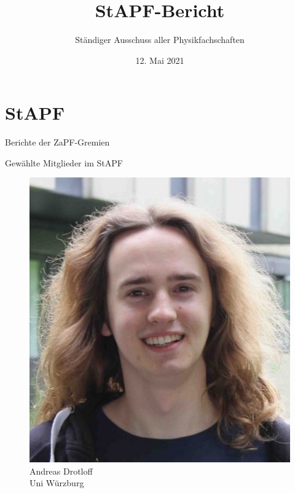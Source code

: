 \documentclass[compress, aspectratio=169]{beamer}
\title[StAPf-Bericht]{StAPF-Bericht}
\author{Ständiger Ausschuss aller Physikfachschaften}
\institute[Zusammenkunft aller Physikfachschaften]
\date{12. Mai 2021}
\begin{document}
\begin{frame}[plain]{}
  \titlepage
\end{frame}


\section{StAPF}

\begin{frame}
\centering
\Huge Berichte der ZaPF-Gremien
\end{frame}


\begin{frame}{Gewählte Mitglieder im StAPF}

  \begin{minipage}{.28\textwidth}
    \begin{figure}
      \begin{minipage}[c]{.57\textwidth}
        \includegraphics[height=0.3\textheight]{andy.jpg}
      \end{minipage} \hfill
      \begin{minipage}[c]{.4\textwidth}
        \caption*{Andreas Drotloff\\Uni Würzburg}
      \end{minipage}
    \end{figure}
  \end{minipage}
\hfill
  \begin{minipage}{.28\textwidth}

\end{minipage}
\end{frame}
\end{document}
